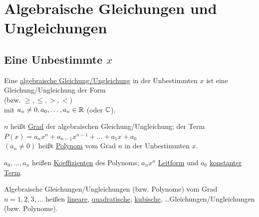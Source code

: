 \clearpage
\section{Algebraische Gleichungen und Ungleichungen}
\subsection{Eine Unbestimmte $x$}
\Def Eine \ul{algebraische Gleichung/Ungleichung} in der Unbestimmten $x$ ist eine Gleichung/Ungleichung der Form\\
 (bzw. $\ge,\le,>,<$)\\
mit $a_n \ne 0, a_0, \ldots, a_n\in\mathbb{R}$ (oder $\mathbb{C}$).

$n$ heißt \ul{Grad} der algebraischen Gleichung/Ungleichung; der Term\\
$P(x)=a_nx^n+a_{n-1}x^{n-1}+\ldots+a_1x+a_0$\\
$(a_n\ne0)$ heißt \ul{Polynom} vom Grad $n$ in der Unbestimmten $x$.

$a_0, \ldots, a_n$ heißen \ul{Koeffizienten} des Polynoms; $a_nx^n$ \ul{Leitform} und $a_0$ \ul{konstanter Term}.

Algebraische Gleichungen/Ungleichungen (bzw. Polynome) vom Grad $n= 1,2,3,\ldots$ heißen \ul{lineare}, \ul{quadratische}, \ul{kubische}, \ldots Gleichungen/Ungleichungen (bzw. Polynome).

\clearpage
